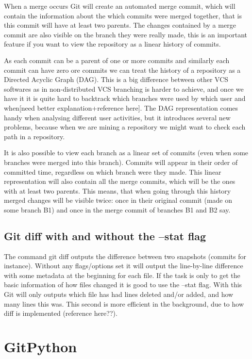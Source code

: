 \documentclass[12pt,twoside,notitlepage]{report}
\begin{document}
When a merge occurs Git will create an automated merge commit, which will contain the information about the which commits were merged together, that is this commit will have at least two parents. The changes contained by a merge commit are also visible on the branch they were really made, this is an important feature if you want to view the repository as a linear history of commits. 

As each commit can be a parent of one or more commits and similarly each commit can have zero ore commits we can treat the history of a repository as a Directed Acyclic Graph (DAG). This is a big difference between other VCS softwares as in non-distributed VCS branching is harder to achieve, and once we have it it is quite hard to backtrack which branches were used by which user and when[need better explanation+reference here]. The DAG representation comes handy when analysing different user activities, but it introduces several new problems, because when we are mining a repository we might want to check each path in a repository. 

It is also possible to view each branch as a linear set of commits (even when some branches were merged into this branch). Commits will appear in their order of committed time, regardless on which branch were they made. This linear representation will also contain all the merge commits, which will be the ones with at least two parents. This means, that when going through this history merged changes will be visible twice: once in their original commit (made on some branch B1) and once in the merge commit of branches B1 and B2 say.
\subsection{Git diff with and without the --stat flag}
The command git diff outputs the difference between two snapshots (commits for instance). Without any flags/options set it will output the line-by-line difference with some metadata at the beginning for each file. If the task is only to get the basic information of how files changed it is good to use the --stat flag. With this Git will only outputs which file has had lines deleted and/or added, and how many lines this was. This second is more efficient in the background, due to how diff is implemented (reference here??).
\section{GitPython}
\end{document}
